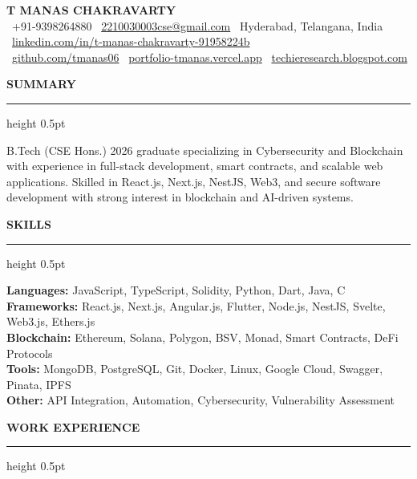 \documentclass[11pt,a4paper]{article}
\newcommand{\cvsection}[1]{%
  \vspace{10pt}%
  {\large\textbf{\MakeUppercase{#1}}}%
  \vspace{2pt}%
  \hrule height 0.5pt%
  \vspace{6pt}%
}
\begin{document}
\begin{center}
  {\Huge \textbf{T MANAS CHAKRAVARTY}} \\[6pt]
  \small
  \faPhone*\ +91-9398264880 \quad \textbar \quad
  \faEnvelope\ \href{mailto:2210030003cse@gmail.com}{2210030003cse@gmail.com} \quad \textbar \quad
  \faMapMarker*\ Hyderabad, Telangana, India \\[3pt]
  \faLinkedin\ \href{https://linkedin.com/in/t-manas-chakravarty-91958224b}{linkedin.com/in/t-manas-chakravarty-91958224b} \\[3pt]
  \faGithub\ \href{https://github.com/tmanas06}{github.com/tmanas06} \quad \textbar \quad
  \faGlobe\ \href{https://portfolio-tmanas.vercel.app}{portfolio-tmanas.vercel.app} \quad \textbar \quad
  \faBlogger\ \href{https://techieresearch.blogspot.com}{techieresearch.blogspot.com}
\end{center}

\cvsection{Summary}
B.Tech (CSE Hons.) 2026 graduate specializing in Cybersecurity and Blockchain with experience in full-stack development, smart contracts, and scalable web applications. Skilled in React.js, Next.js, NestJS, Web3, and secure software development with strong interest in blockchain and AI-driven systems.

\cvsection{Skills}
\noindent\textbf{Languages:} JavaScript, TypeScript, Solidity, Python, Dart, Java, C \\
\textbf{Frameworks:} React.js, Next.js, Angular.js, Flutter, Node.js, NestJS, Svelte, Web3.js, Ethers.js \\
\textbf{Blockchain:} Ethereum, Solana, Polygon, BSV, Monad, Smart Contracts, DeFi Protocols \\
\textbf{Tools:} MongoDB, PostgreSQL, Git, Docker, Linux, Google Cloud, Swagger, Pinata, IPFS \\
\textbf{Other:} API Integration, Automation, Cybersecurity, Vulnerability Assessment

\cvsection{Work Experience}
\end{document}
